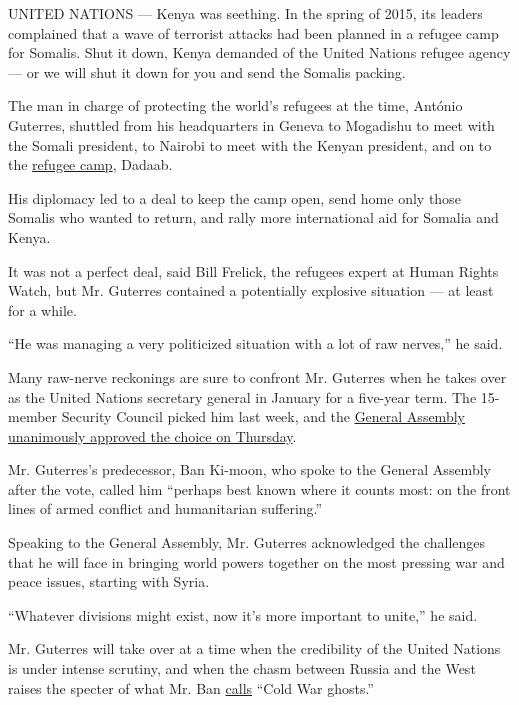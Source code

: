 UNITED NATIONS --- Kenya was seething. In the spring of 2015, its
leaders complained that a wave of terrorist attacks had been planned in
a refugee camp for Somalis. Shut it down, Kenya demanded of the United
Nations refugee agency --- or we will shut it down for you and send the
Somalis packing.

The man in charge of protecting the world's refugees at the time,
António Guterres, shuttled from his headquarters in Geneva to Mogadishu
to meet with the Somali president, to Nairobi to meet with the Kenyan
president, and on to the
\href{https://www.unhcr-regional.or.ke/news/kenya-somalia-ant\%C3\%B3nio-guterres-ends-visit-discuss-future-dadaab}{refugee
camp}, Dadaab.

His diplomacy led to a deal to keep the camp open, send home only those
Somalis who wanted to return, and rally more international aid for
Somalia and Kenya.

It was not a perfect deal, said Bill Frelick, the refugees expert at
Human Rights Watch, but Mr. Guterres contained a potentially explosive
situation --- at least for a while.

``He was managing a very politicized situation with a lot of raw
nerves,'' he said.

Many raw-nerve reckonings are sure to confront Mr. Guterres when he
takes over as the United Nations secretary general in January for a
five-year term. The 15-member Security Council picked him last week, and
the
\href{https://twitter.com/UNwebcast/status/786577450276839424}{General
Assembly unanimously approved the choice on Thursday}.

Mr. Guterres's predecessor, Ban Ki-moon, who spoke to the General
Assembly after the vote, called him ``perhaps best known where it counts
most: on the front lines of armed conflict and humanitarian suffering.''

Speaking to the General Assembly, Mr. Guterres acknowledged the
challenges that he will face in bringing world powers together on the
most pressing war and peace issues, starting with Syria.

``Whatever divisions might exist, now it's more important to unite,'' he
said.

Mr. Guterres will take over at a time when the credibility of the United
Nations is under intense scrutiny, and when the chasm between Russia and
the West raises the specter of what Mr. Ban
\href{http://www.unric.org/en/latest-un-buzz/30340-ban-ki-moon-let-us-summon-the-spirit-of-reykjavik}{calls}
``Cold War ghosts.''

